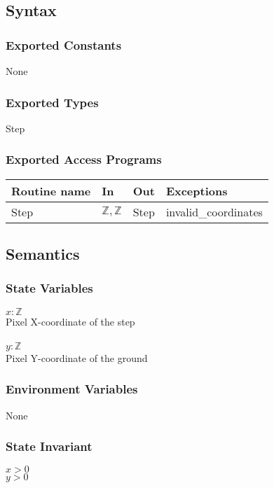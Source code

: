 \documentclass[12pt]{article}
\begin{document}
\subsection* {Syntax}

\subsubsection* {Exported Constants}

None

\subsubsection* {Exported Types}

Step

\subsubsection* {Exported Access Programs}

\begin{tabular}{| l | l | l | l |}
\hline
\textbf{Routine name} & \textbf{In} & \textbf{Out} & \textbf{Exceptions}\\
\hline
Step &$\mathbb{Z}, \mathbb{Z}$ & Step & invalid\_coordinates\\
\hline

\end{tabular}

\subsection* {Semantics}

\subsubsection* {State Variables}

$x: \mathbb{Z}$\\
Pixel X-coordinate of the step\\\\
$y: \mathbb{Z}$\\
Pixel Y-coordinate of the ground\\
\subsubsection* {Environment Variables}
None
\subsubsection* {State Invariant}
$x > 0$\\
$y > 0$\\ 
\end{document}
